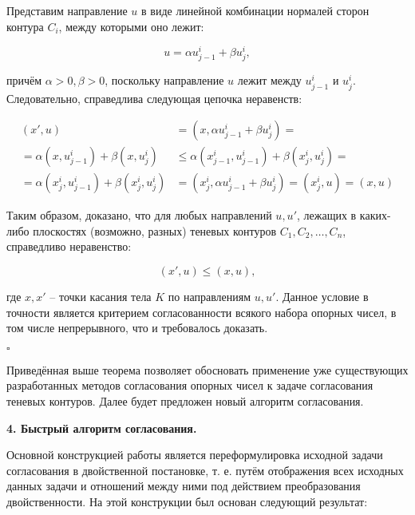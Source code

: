\documentclass[a4paper, 10pt]{article}
\theoremstyle{definition}
\theoremstyle{plain}
\theoremstyle{plain}
\begin{document}
Представим направление $u$ в виде линейной комбинации нормалей сторон контура
$C_{i}$, между которыми оно лежит:

\begin{equation*}
 u = \alpha u^{i}_{j - 1} + \beta u^{i}_{j},
\end{equation*}

причём $\alpha > 0, \beta > 0$, поскольку направление $u$ лежит между
$u^{i}_{j - 1}$ и $u^{i}_{j}$. Следовательно, справедлива следующая цепочка
неравенств:

\begin{align*}
 (x', u) &= (x, \alpha u^{i}_{j - 1} + \beta u^{i}_{j}) = \\
 = \alpha (x, u^{i}_{j - 1}) + \beta (x, u^{i}_{j}) &\leq
 \alpha (x^{i}_{j - 1}, u^{i}_{j - 1}) + \beta (x^{i}_{j}, u^{i}_{j}) = \\
 = \alpha (x^{i}_{j}, u^{i}_{j - 1}) + \beta (x^{i}_{j}, u^{i}_{j}) &=
 (x^{i}_{j}, \alpha u^{i}_{j - 1} + \beta u^{i}_{j}) = (x^{i}_{j}, u) = (x, u)
\end{align*}

Таким образом, доказано, что для любых направлений $u, u'$, лежащих в каких-либо
плоскостях (возможно, разных) теневых контуров $C_{1}, C_{2}, \ldots, C_{n}$,
справедливо неравенство:

\begin{equation*}
 (x', u) \leq (x, u),
\end{equation*}

где $x, x'$ -- точки касания тела $K$ по направлениям $u, u'$. Данное условие
в точности является критерием согласованности всякого набора опорных чисел, в
том числе непрерывного, что и требовалось доказать.

$\square$

Приведённая выше теорема позволяет обосновать применение уже существующих
разработанных методов согласования опорных чисел к задаче согласования теневых
контуров. Далее будет предложен новый алгоритм согласования.


\textbf{4. Быстрый алгоритм согласования.}

Основной конструкцией работы \cite{palachev} является переформулировка исходной
задачи согласования в двойственной постановке, т. е. путём отображения всех
исходных данных задачи и отношений между ними  под действием преобразования
двойственности. На этой конструкции был основан следующий результат:
\end{document}
